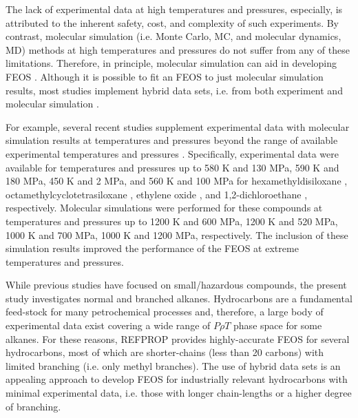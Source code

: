 \documentclass[preprint,letterpaper,floatfix,citeautoscript,aip,jcp]{revtex4-1}
\begin{document}
The lack of experimental data at high temperatures and pressures, especially, is attributed to the inherent safety, cost, and complexity of such experiments. By contrast, molecular simulation (i.e. Monte Carlo, MC, and molecular dynamics, MD) methods at high temperatures and pressures do not suffer from any of these limitations. Therefore, in principle, molecular simulation can aid in developing FEOS \cite{Thol2016_LJ,Thol_LJTS,Rutkai2017,Lustig2015,Rutkai2015}. Although it is possible to fit an FEOS to just molecular simulation results, most studies implement hybrid data sets, i.e. from both experiment and molecular simulation \cite{Rutkai2013}.

For example, several recent studies supplement experimental data with molecular simulation results at temperatures and pressures beyond the range of available experimental temperatures and pressures \cite{Thol2016_siloxane_first,Thol2016_siloxane,Thol2017,Thol2015}. Specifically, experimental data were available for temperatures and pressures up to 580 K and 130 MPa, 590 K and 180 MPa, 450 K and 2 MPa, and 560 K and 100 MPa for hexamethyldisiloxane \cite{Thol2016_siloxane_first}, octamethylcyclotetrasiloxane \cite{Thol2016_siloxane}, ethylene oxide \cite{Thol2015}, and 1,2-dichloroethane \cite{Thol2017}, respectively. Molecular simulations were performed for these compounds at temperatures and pressures up to 1200 K and 600 MPa, 1200 K and 520 MPa, 1000 K and 700 MPa, 1000 K and 1200 MPa, respectively. The inclusion of these simulation results improved the performance of the FEOS at extreme temperatures and pressures. 

% 

While previous studies have focused on small/hazardous compounds, the present study investigates normal and branched alkanes. Hydrocarbons are a fundamental feed-stock for many petrochemical processes and, therefore, a large body of experimental data exist covering a wide range of $P \rho T$ phase space for some alkanes. For these reasons, REFPROP provides highly-accurate FEOS for several hydrocarbons, most of which are shorter-chains (less than 20 carbons) with limited branching (i.e. only methyl branches). The use of hybrid data sets is an appealing approach to develop FEOS for industrially relevant hydrocarbons with minimal experimental data, i.e. those with longer chain-lengths or a higher degree of branching.
\end{document}
